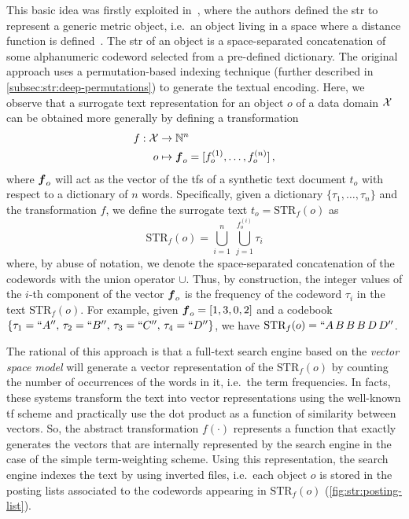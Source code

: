 This basic idea was firstly exploited in~\cite{gennaro2010approach}, where the authors defined the \acrfull{str} to represent a generic metric object, i.e.\ an object living in a space where a distance function is defined~\cite{zezula2006similarity}.
The \gls{str} of an object is a space-separated concatenation of some alphanumeric codeword selected from a pre-defined dictionary.
The original approach uses a permutation-based indexing technique (further described in \ref{subsec:str:deep-permutations}) to generate the textual encoding.
Here, we observe that a surrogate text representation for an object $o$ of a data domain $\mathcal{X}$ can be obtained more generally by defining a transformation
\begin{align}
	f : \mathcal{X} &\to \mathbb{N}^n\\
	o &\mapsto \boldsymbol {f}_o=[f_o^{(1)}, \dots, f_o^{(n)}] \,,
\end{align}
where $\boldsymbol {f}_o$ will act as the vector of the \glspl{tf} of a synthetic text document $t_o$ with respect to a dictionary of $n$ words.
Specifically, given a dictionary $\{\tau_1, \dots, \tau_n\}$ and the transformation $f$, we define the surrogate text $ t_o=\text{STR}_f(o)$ as
\begin{equation}
	\text{STR}_f(o)=\bigcup_{i=1}^n\,\bigcup_{j=1}^{f_o^{(i)}} \tau_i
\end{equation}
where, by abuse of notation, we denote the space-separated concatenation of the codewords with the union operator $\cup$.
Thus, by construction, the integer values of the $i$-th component of the vector $\boldsymbol {f}_o$ is the frequency of the codeword $\tau_i$ in the text $\text{STR}_f(o)$.
For example, given $\boldsymbol {f}_o=[1,3,0,2]$ and a codebook $\{\tau_1=``A'',\,  \tau_2=``B'',\, \tau_3=``C'', \,\tau_4=``D''\}$, we have $\text{STR}_f(o)=``A \, B \, B \, B \, D \, D''$.

The rational of this approach is that a full-text search engine based on the \emph{vector space model} \cite{salton1986introduction} will generate a vector representation of the $\text{STR}_f(o)$ by counting the number of occurrences of the words in it, i.e.\ the term frequencies.
In facts, these systems transform the text into vector representations using the well-known \gls{tf} scheme and practically use the dot product as a function of similarity between vectors.
So, the abstract transformation $f(\cdot)$ represents a function that exactly generates the vectors that are internally represented by the search engine in the case of the simple term-weighting scheme.
Using this representation, the search engine indexes the text by using inverted files, i.e.\ each object $o$ is stored in the posting lists associated to the codewords appearing in $\text{STR}_f(o)$ (\ref{fig:str:posting-list}).

